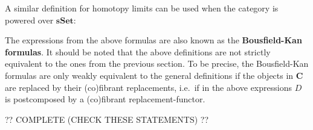     A similar definition for homotopy limits can be used when the category is powered over $\mathbf{sSet}$:
    \begin{remark}
        The expressions from the above formulas are also known as the \textbf{Bousfield-Kan formulas}. It should be noted that the above definitions are not strictly equivalent to the ones from the previous section. To be precise, the Bousfield-Kan formulas are only weakly equivalent to the general definitions if the objects in $\mathbf{C}$ are replaced by their (co)fibrant replacements, i.e.~if in the above expressions $D$ is postcomposed by a (co)fibrant replacement-functor.
    \end{remark}

    ?? COMPLETE (CHECK THESE STATEMENTS) ??

